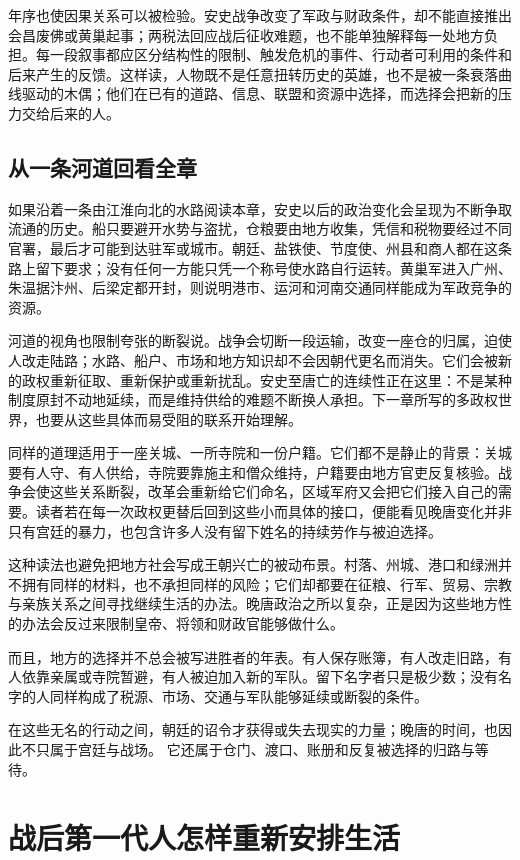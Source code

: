 年序也使因果关系可以被检验。安史战争改变了军政与财政条件，却不能直接推出会昌废佛或黄巢起事；两税法回应战后征收难题，也不能单独解释每一处地方负担。每一段叙事都应区分结构性的限制、触发危机的事件、行动者可利用的条件和后来产生的反馈。这样读，人物既不是任意扭转历史的英雄，也不是被一条衰落曲线驱动的木偶；他们在已有的道路、信息、联盟和资源中选择，而选择会把新的压力交给后来的人。

\subsection{从一条河道回看全章}
如果沿着一条由江淮向北的水路阅读本章，安史以后的政治变化会呈现为不断争取流通的历史。船只要避开水势与盗扰，仓粮要由地方收集，凭信和税物要经过不同官署，最后才可能到达驻军或城市。朝廷、盐铁使、节度使、州县和商人都在这条路上留下要求；没有任何一方能只凭一个称号使水路自行运转。黄巢军进入广州、朱温据汴州、后梁定都开封，则说明港市、运河和河南交通同样能成为军政竞争的资源。

河道的视角也限制夸张的断裂说。战争会切断一段运输，改变一座仓的归属，迫使人改走陆路；水路、船户、市场和地方知识却不会因朝代更名而消失。它们会被新的政权重新征取、重新保护或重新扰乱。安史至唐亡的连续性正在这里：不是某种制度原封不动地延续，而是维持供给的难题不断换人承担。下一章所写的多政权世界，也要从这些具体而易受阻的联系开始理解。

同样的道理适用于一座关城、一所寺院和一份户籍。它们都不是静止的背景：关城要有人守、有人供给，寺院要靠施主和僧众维持，户籍要由地方官吏反复核验。战争会使这些关系断裂，改革会重新给它们命名，区域军府又会把它们接入自己的需要。读者若在每一次政权更替后回到这些小而具体的接口，便能看见晚唐变化并非只有宫廷的暴力，也包含许多人没有留下姓名的持续劳作与被迫选择。

这种读法也避免把地方社会写成王朝兴亡的被动布景。村落、州城、港口和绿洲并不拥有同样的材料，也不承担同样的风险；它们却都要在征粮、行军、贸易、宗教与亲族关系之间寻找继续生活的办法。晚唐政治之所以复杂，正是因为这些地方性的办法会反过来限制皇帝、将领和财政官能够做什么。

而且，地方的选择并不总会被写进胜者的年表。有人保存账簿，有人改走旧路，有人依靠亲属或寺院暂避，有人被迫加入新的军队。留下名字者只是极少数；没有名字的人同样构成了税源、市场、交通与军队能够延续或断裂的条件。

在这些无名的行动之间，朝廷的诏令才获得或失去现实的力量；晚唐的时间，也因此不只属于宫廷与战场。
它还属于仓门、渡口、账册和反复被选择的归路与等待。

\section{战后第一代人怎样重新安排生活}

